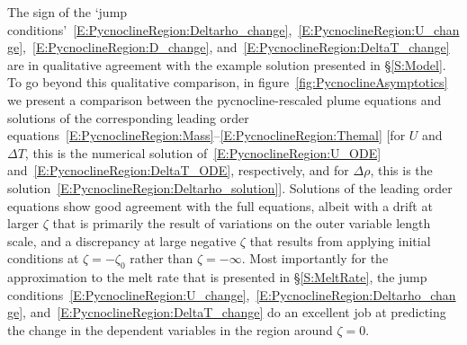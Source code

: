 \documentclass[openacc]{rsproca_new}%
\begin{document}
The sign of the `jump conditions'~\eqref{E:PycnoclineRegion:Deltarho_change},~\eqref{E:PycnoclineRegion:U_change},~\eqref{E:PycnoclineRegion:D_change}, and~\eqref{E:PycnoclineRegion:DeltaT_change} are in qualitative agreement with the example solution presented in \S\ref{S:Model}. To go beyond this qualitative comparison, in figure~\ref{fig:PycnoclineAsymptotics} we present a comparison between the pycnocline-rescaled plume equations and solutions of the corresponding leading order equations~\eqref{E:PycnoclineRegion:Mass}--\eqref{E:PycnoclineRegion:Themal}  [for $U$ and $\Delta T$, this is the numerical solution of~\eqref{E:PycnoclineRegion:U_ODE} and~\eqref{E:PycnoclineRegion:DeltaT_ODE}, respectively, and for $\Delta \rho$, this is the solution~\eqref{E:PycnoclineRegion:Deltarho_solution}]. Solutions of the leading order equations show good agreement with the full equations, albeit with a drift at larger $\zeta$ that is primarily the result of variations on the outer variable length scale, and a discrepancy at large negative $\zeta$ that results from applying  initial conditions at $\zeta = -\zeta_0$ rather than $\zeta = -\infty$. Most importantly for the approximation to the melt rate that is presented in \S\ref{S:MeltRate}, the jump conditions~\eqref{E:PycnoclineRegion:U_change},~\eqref{E:PycnoclineRegion:Deltarho_change}, and~\eqref{E:PycnoclineRegion:DeltaT_change} do an excellent job at predicting the change in the dependent variables in the region around $\zeta = 0$.

\end{document}
